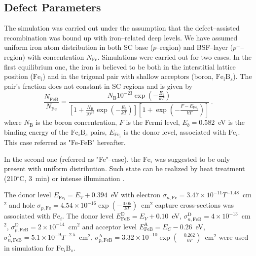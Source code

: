 \documentclass[journal]{IEEEtran}
\begin{document}
\subsection{Defect Parameters}

The simulation was carried out under the assumption that the defect--assisted recombination was
bound up with iron--related deep levels.
We have assumed uniform iron atom distribution in both SC base ($p$--region) and BSF--layer ($p^+$--region) with concentration $N_{\mathrm{Fe}}$.
Simulations were carried out for two cases.
In the first equilibrium one, the iron is believed to be both in the interstitial lattice position ($\mathrm{Fe}_i$) and in the trigonal pair with shallow acceptors (boron, $\mathrm{Fe}_i\mathrm{B}_s$).
The pair's fraction does not constant in SC regions and is given by \cite{MurphyJAP2011,FeB:kinetic}
\begin{equation}
\label{eqNFeB}
    \frac{N_{\mathrm{FeB}}}{N_{\mathrm{Fe}}}=\frac{N_\mathrm{B}10^{-23}\exp\left(-\frac{E_b}{kT}\right)}
     {\left[1+\frac{N_\mathrm{B}}{10^{23}}\exp\left(-\frac{E_b}{kT}\right)\right]\left[1+\exp\left(-\frac{F-E_{\mathrm{Fe}_i}}{kT}\right)\right]}\,.
\end{equation}
where
$N_\mathrm{B}$ is the boron concentration,
$F$ is the Fermi level,
$E_b=0.582$~eV is the binding energy of the $\mathrm{Fe}_i\mathrm{B}_s$ pairs,
$E_{\mathrm{Fe}_i}$ is the donor level, associated with $\mathrm{Fe}_i$.
This case referred as "Fe-FeB" hereafter.

In the second one (referred as "Fe"--case), the $\mathrm{Fe}_i$ was suggested to be only present  with uniform distribution.
Such state can be realized by heat treatment (210$^\circ$C, 3~min) \cite{FeB_Zong} or intense illumination \cite{FeBLight2}.

The donor level $E_{\mathrm{Fe}_i} = E_V+0.394$~eV
with electron $\sigma_{n,{\mathrm{Fe}}}=3.47\times10^{-11}T^{-1.48}$~cm$^2$ and
hole $\sigma_{p,{\mathrm{Fe}}}=4.54\times10^{-16}\exp\left(-\frac{0.05}{kT}\right)$~cm$^2$ capture cross-sections \cite{MurphyJAP2011,ROUGIEUX2018}
was associated with $\mathrm{Fe}_i$.
The donor level $E_{\mathrm{FeB}}^\mathrm{D}= E_V+0.10$~eV,
$\sigma_{n,{\mathrm{FeB}}}^\mathrm{D}=4\times10^{-13}$~cm$^2$,
$\sigma_{p,{\mathrm{FeB}}}^\mathrm{D}=2\times10^{-14}$~cm$^2$
and acceptor level $E_{\mathrm{FeB}}^\mathrm{A}= E_C-0.26$~eV,
$\sigma_{n,{\mathrm{FeB}}}^\mathrm{A}=5.1\times10^{-9}T^{-2.5}$~cm$^2$,
$\sigma_{p,{\mathrm{FeB}}}^\mathrm{A}=3.32\times10^{-10}\exp\left(-\frac{0.262}{kT}\right)$~cm$^2$
\cite{Istratov1999,MurphyJAP2011,ROUGIEUX2018}
were used in simulation for $\mathrm{Fe}_i\mathrm{B}_s$.
\end{document}
